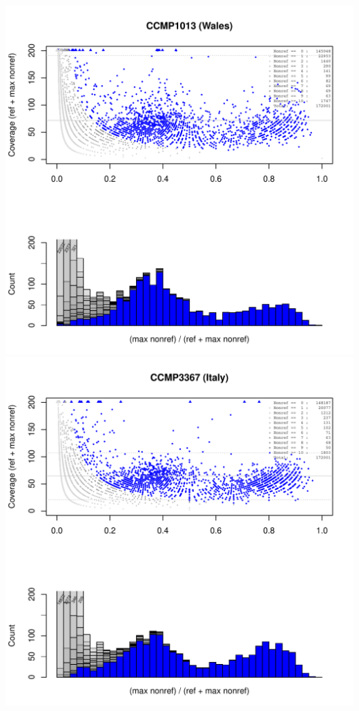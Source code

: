 \documentclass{article}\usepackage[]{graphicx}\usepackage[]{color}
\makeatletter
\def\maxwidth{ %
  \ifdim\Gin@nat@width>\linewidth
    \linewidth
  \else
    \Gin@nat@width
  \fi
}
\newenvironment{knitrout}{}{} %
\makeatother
\begin{document}
\begin{knitrout}
{\centering \includegraphics[width=\maxwidth]{figs-knitr/unnamed-chunk-40-1} 
\includegraphics[width=\maxwidth]{figs-knitr/unnamed-chunk-40-2} 

}



\end{knitrout}
\end{document}
